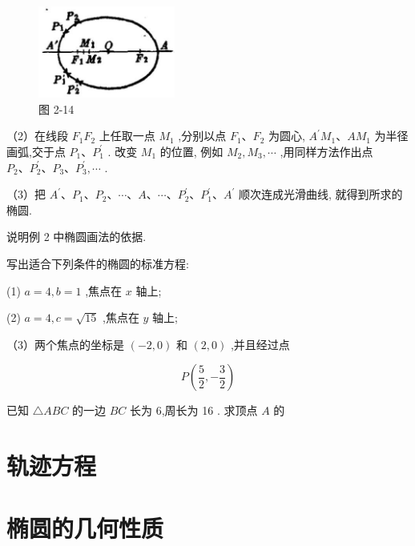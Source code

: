 \documentclass[lang=cn,newtx,10pt,scheme=chinese]{elegantbook}
\begin{document}
\begin{figure}[h]
  \centering
  \includegraphics[max width=0.4\textwidth]{images/01912cc2-ffb6-728e-9ae7-b113ff05c64b_89_799031.jpg}
  \caption{图 2-14}
\end{figure}



（2）在线段 \({F}_{1}{F}_{2}\) 上任取一点 \({M}_{1}\) ,分别以点 \({F}_{1}\text{、}{F}_{2}\) 为圆心, \({A}^{\prime }{M}_{1}\text{、}A{M}_{1}\) 为半径画弧,交于点 \({P}_{1}\text{、}{P}_{1}^{\prime }\) . 改变 \({M}_{1}\) 的位置, 例如 \({M}_{2},{M}_{3},\cdots\) ,用同样方法作出点 \({P}_{2}\text{、}{P}_{2}^{\prime }\text{、}{P}_{3}\text{、}{P}_{3}^{\prime },\cdots\) .

（3）把 \({A}^{\prime }\text{、}{P}_{1}\text{、}{P}_{2}\text{、}\cdots \text{、}A\text{、}\cdots \text{、}{P}_{2}^{\prime }\text{、}{P}_{1}^{\prime }\text{、}{A}^{\prime }\) 顺次连成光滑曲线, 就得到所求的椭圆.

\begin{problemset}[练习]

\item 说明例 2 中椭圆画法的依据.

\item 写出适合下列条件的椭圆的标准方程:

(1) \(a = 4,b = 1\) ,焦点在 \(x\) 轴上;

(2) \(a = 4,c = \sqrt{15}\) ,焦点在 \(y\) 轴上;

（3）两个焦点的坐标是 \(\left( {-2,0}\right)\) 和 \(\left( {2,0}\right)\) ,并且经过点

\[
  P\left( {\frac{5}{2}, - \frac{3}{2}}\right)
\]

\item 已知 \(\bigtriangleup {ABC}\) 的一边 \({BC}\) 长为 6,周长为 16 . 求顶点 \(A\) 的

\end{problemset}

\section*{轨迹方程}

\section{椭圆的几何性质}
\end{document}
